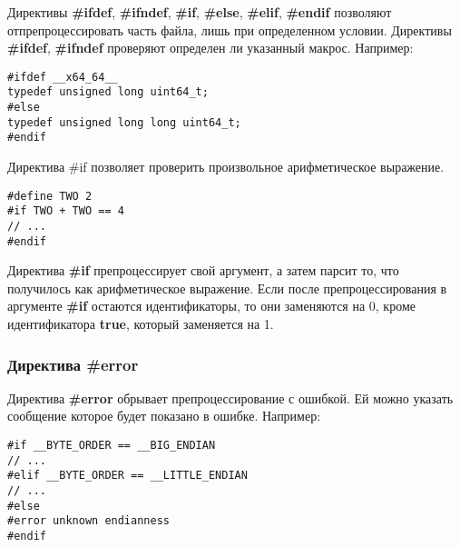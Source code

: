 Директивы {\bf \#ifdef}, {\bf \#ifndef}, {\bf \#if}, {\bf \#else}, {\bf \#elif}, {\bf \#endif} позволяют отпрепроцессировать часть файла, лишь при определенном условии. Директивы {\bf \#ifdef}, {\bf \#ifndef} проверяют определен ли указанный макрос. Например:
\begin{verbatim}
#ifdef __x64_64__
typedef unsigned long uint64_t;
#else
typedef unsigned long long uint64_t;
#endif
\end{verbatim}

Директива \#if позволяет проверить произвольное арифметическое выражение.
\begin{verbatim}
#define TWO 2
#if TWO + TWO == 4
// ...
#endif
\end{verbatim}
Директива {\bf \#if} препроцессирует свой аргумент, а затем парсит то, что получилось как арифметическое выражение. Если после препроцессирования в аргументе {\bf \#if} остаются идентификаторы, то они заменяются на 0, кроме идентификатора {\bf true}, который заменяется на 1.

\subsubsection{Директива \#error}

Директива {\bf \#error} обрывает препроцессирование с ошибкой. Ей можно указать сообщение которое будет показано в ошибке. Например:
\begin{verbatim}
#if __BYTE_ORDER == __BIG_ENDIAN
// ...
#elif __BYTE_ORDER == __LITTLE_ENDIAN
// ...
#else
#error unknown endianness
#endif
\end{verbatim}

